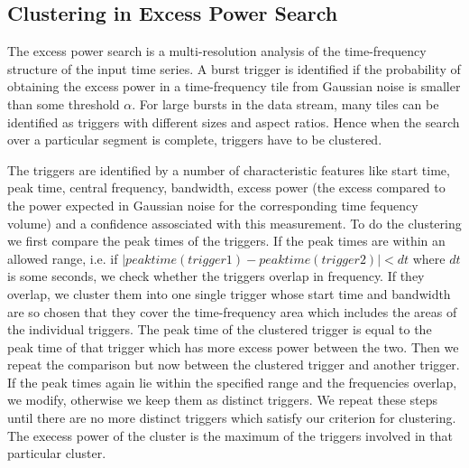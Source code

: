 \clearpage

\subsection{Clustering in Excess Power Search}
\label{section:clustering}
The excess power search is a multi-resolution analysis of the 
time-frequency structure of the input time series.  A burst trigger is 
identified if the probability of obtaining the excess power in a 
time-frequency tile from Gaussian noise is smaller
than some threshold $\alpha$.   For large bursts in the data stream,
 many tiles can be identified as triggers with different sizes and
aspect ratios.   Hence when the search over a particular segment is
complete,   triggers have to be clustered. 

The triggers are identified by a number of characteristic features like 
start time,  peak time,  central frequency,  bandwidth,  excess power (the 
excess compared to the power expected in Gaussian noise for the corresponding
time fequency volume)  and a confidence assosciated with this measurement.
 To do the clustering we first compare the peak times of the triggers.
 If the peak times are within an allowed range,  i.e. if 
$|peaktime(trigger 1) - peaktime(trigger 2)| < dt$ where 
$dt$ is some seconds,  we check whether the triggers  overlap 
in frequency.  If they overlap,  we cluster them into one single trigger
whose start time and bandwidth are so chosen that they cover the time-frequency 
area which includes the areas of the individual triggers.  The peak time
of the clustered trigger is equal to the peak time of that trigger which has 
more excess power between the two.  Then we repeat the comparison but now between
the clustered trigger and another trigger.  If the peak times again lie
within the specified range and the frequencies overlap,  we modify,  
 otherwise we keep them as distinct triggers.  We repeat these steps until
there are no more distinct triggers which satisfy our criterion for clustering.  
  The execess power of the cluster is the maximum of the triggers
involved in that particular cluster.

